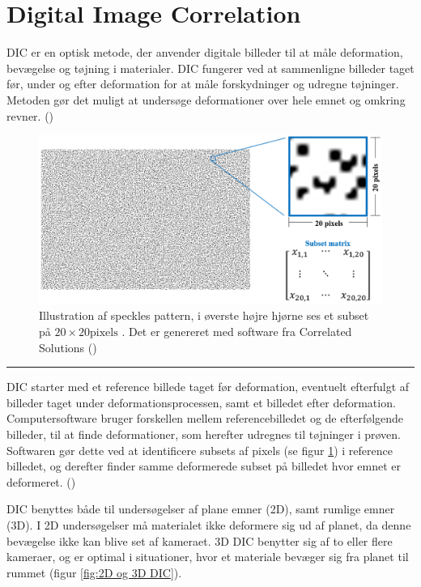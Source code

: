 \section{Digital Image Correlation} \label{DIC afsnit}
DIC er en optisk metode, der anvender digitale billeder til at måle deformation, bevægelse og tøjning i materialer. DIC fungerer ved at sammenligne billeder taget før, under og efter deformation for at måle forskydninger og udregne tøjninger. Metoden gør det muligt at undersøge deformationer over hele emnet og omkring revner. (\cite{Zaya2023ApplicationReview})

\begin{figure}[H]
    \centering
    \includegraphics[width=0.85\linewidth]{Sections/2 Problemanalyse/Media/Speckle pattern subset matrix.png}
    \caption{Illustration af speckles pattern, i øverste højre hjørne ses et subset på $20 \times 20 \text{pixels}$ . Det er genereret med software fra Correlated Solutions (\cite{CorrelatedSolutions2025SpeckleInc.})}
    \label{fig:speckle pattern subset}
\end{figure} \plainbreak{-0.5}

DIC starter med et reference billede taget før deformation, eventuelt efterfulgt af billeder taget under deformationsprocessen, samt et billedet efter deformation. Computersoftware bruger forskellen mellem referencebilledet og de efterfølgende billeder, til at finde deformationer, som herefter udregnes til tøjninger i prøven. Softwaren gør dette ved at identificere subsets af pixels (se figur \ref{fig:speckle pattern subset}) i reference billedet, og derefter finder samme deformerede subset på billedet hvor emnet er deformeret. (\cite{Zaya2023ApplicationReview})

DIC benyttes både til undersøgelser af plane emner (2D), samt rumlige emner (3D). I 2D undersøgelser må materialet ikke deformere sig ud af planet, da denne bevægelse ikke kan blive set af kameraet. 3D DIC benytter sig af to eller flere kameraer, og er optimal i situationer, hvor et materiale bevæger sig fra planet til rummet (figur \ref{fig:2D og 3D DIC}).

